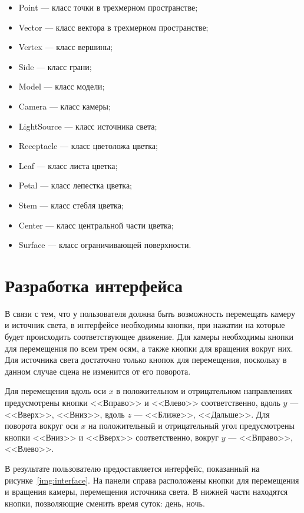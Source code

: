 \begin{itemize}[label=---]
	\item Point --- класс точки в трехмерном пространстве;
	\item Vector --- класс вектора в трехмерном пространстве;
	\item Vertex --- класс вершины;
	\item Side --- класс грани;
	\item Model --- класс модели;
	\item Camera --- класс камеры;
	\item LightSource --- класс источника света;
	\item Receptacle --- класс цветоложа цветка;
	\item Leaf --- класс листа цветка;
	\item Petal --- класс лепестка цветка;
	\item Stem --- класс стебля цветка;
	\item Center --- класс центральной части цветка;
	\item Surface --- класс ограничивающей поверхности.
\end{itemize}

\section{Разработка интерфейса}

В связи с тем, что у пользователя должна быть возможность перемещать камеру и источник света, в интерфейсе необходимы кнопки, при нажатии на которые будет происходить соответствующее движение. Для камеры необходимы кнопки для перемещения по всем трем осям, а также кнопки для вращения вокруг них. Для источника света достаточно только кнопок для перемещения, поскольку в данном случае сцена не изменится от его поворота.

Для перемещения вдоль оси $x$ в положительном и отрицательном направлениях предусмотрены кнопки <<Вправо>> и <<Влево>> соответственно, вдоль $y$ --- <<Вверх>>, <<Вниз>>, вдоль $z$ --- <<Ближе>>, <<Дальше>>. Для поворота вокруг оси $x$ на положительный и отрицательный угол предусмотрены кнопки <<Вниз>> и <<Вверх>> соответственно, вокруг $y$ --- <<Вправо>>, <<Влево>>.

В результате пользователю предоставляется интерфейс, показанный на рисунке~\ref{img:interface}. На панели справа расположены кнопки для перемещения и вращения камеры, перемещения источника света. В нижней части находятся кнопки, позволяющие сменить время суток: день, ночь.

